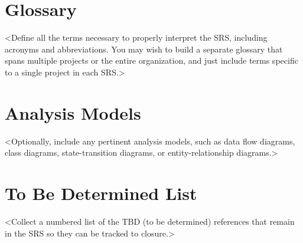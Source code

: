 \begin{appendices}
	\chapter{Glossary}
	<Define all the terms necessary to properly interpret the SRS, including acronyms and abbreviations. You may wish to build a separate glossary that spans multiple projects or the entire organization, and just include terms specific to a single project in each SRS.>
	\chapter{Analysis Models}
	<Optionally, include any pertinent analysis models, such as data flow diagrams, class diagrams, state-transition diagrams, or entity-relationship diagrams.>
	\chapter{To Be Determined List}
	<Collect a numbered list of the TBD (to be determined) references that remain in the SRS so they can be tracked to closure.>
\end{appendices}